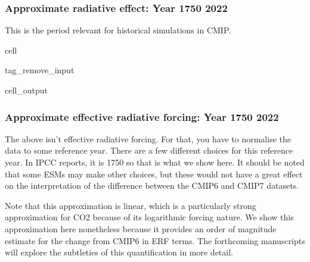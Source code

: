 \documentclass[letterpaper,10pt,english]{jupyterBook}
\begin{document}
\subsubsection{Approximate radiative effect: Year 1750 \sphinxhyphen{} 2022}
\label{\detokenize{user-guide-historical:approximate-radiative-effect-year-1750-2022}}
\sphinxAtStartPar
This is the period relevant for historical simulations in CMIP.

\begin{sphinxuseclass}{cell}
\begin{sphinxuseclass}{tag_remove_input}\begin{sphinxVerbatimOutput}

\begin{sphinxuseclass}{cell_output}
\noindent{}

\end{sphinxuseclass}\end{sphinxVerbatimOutput}

\end{sphinxuseclass}
\end{sphinxuseclass}

\subsubsection{Approximate effective radiative forcing: Year 1750 \sphinxhyphen{} 2022}
\label{\detokenize{user-guide-historical:approximate-effective-radiative-forcing-year-1750-2022}}
\sphinxAtStartPar
The above isn’t effective radiative forcing.
For that, you have to normalise the data to some reference year.
There are a few different choices for this reference year.
In IPCC reports, it is 1750 so that is what we show here.
It should be noted that some ESMs may make other choices,
but these would not have a great effect on the interpretation
of the difference between the CMIP6 and CMIP7 datasets.

\sphinxAtStartPar
Note that this approximation is linear,
which is a particularly strong approximation for CO2
because of its logarithmic forcing nature.
We show this approximation here nonetheless
because it provides an order of magnitude estimate
for the change from CMIP6 in ERF terms.
The forthcoming manuscripts will explore the subtleties
of this quantification in more detail.
\end{document}
